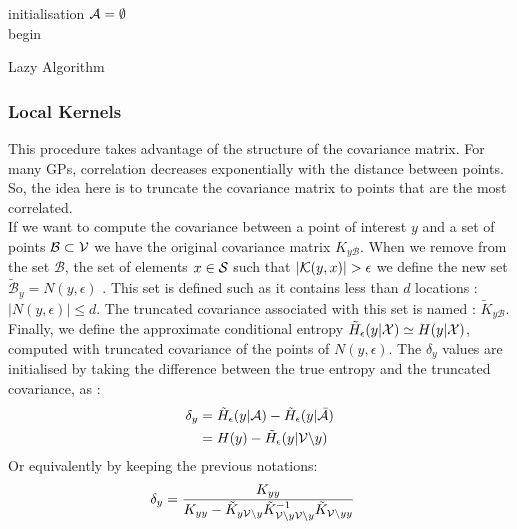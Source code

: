 \documentclass[12pt,twoside]{report}
\begin{document}
\begin{algorithm}[h]
 initialisation\;
 $\A = \emptyset$ \\
 begin\;
\caption{Lazy Algorithm}
\label{alg:lazy}
\end{algorithm}

\subsubsection{Local Kernels} This procedure takes advantage of the structure of the covariance matrix. For many GPs, correlation decreases exponentially with the distance between points. So, the idea here is to truncate the covariance matrix to points that are the most correlated. \\ 

If we want to compute the covariance between a point of interest $y$ and a set of points $\mathcal{B} \subset \V $ we have the original covariance matrix $K_{y\mathcal{B}}$. When we remove from the set $\mathcal{B}$, the set of elements  $x \in \S$ such that $|\K(y,x)| > \epsilon $ we define the new set  $\tilde{\mathcal{B}}_y = N(y,\epsilon)$ . This set is defined such as it contains less than $d$ locations : $|N(y,\epsilon)| \leq d $. The truncated covariance associated with this set is named : $\tilde{K}_{y\mathcal{B}}$. Finally, we define the approximate conditional entropy $\tilde{H}_\epsilon(y | \X) \simeq H(y | \X)$, computed with truncated covariance of the points of $N(y,\epsilon)$. The $\delta_y$ values are initialised by taking the difference between the true entropy and the truncated covariance, as :
\begin{align}
	\delta_y &= \tilde{H}_\epsilon(y | \A) - \tilde{H}_\epsilon(y | \bar{\A}) \\
			&= H(y) - \tilde{H}_\epsilon(y | \V \backslash y )
\end{align}
Or equivalently by keeping the previous notations: 
\begin{align}
	\delta_y &= \frac{K_{yy} }{K_{yy} - \tilde{K}_{y\V \backslash y} \tilde{K}_{\V \backslash y \V \backslash y}^{-1} \tilde{K}_{\V \backslash y y} } \label{equ:initLocal}
\end{align}
\end{document}
